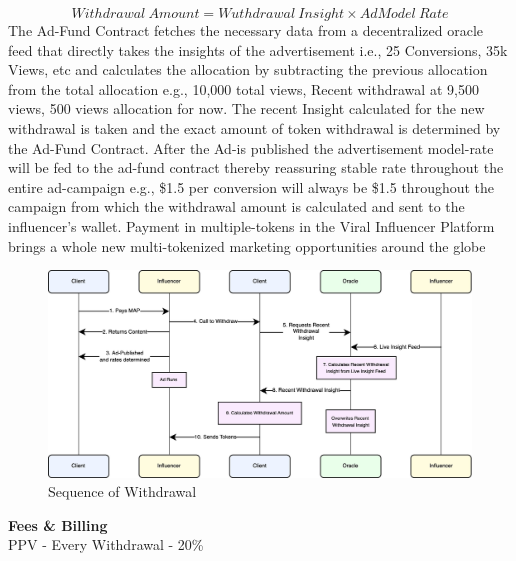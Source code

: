 \documentclass[10pt]{article}
\begin{document}
\begin{equation}
Withdrawal\:Amount=Wuthdrawal\:Insight \times AdModel\:Rate
\end{equation}
The Ad-Fund Contract fetches the necessary data from a decentralized oracle feed that directly takes the insights of the advertisement i.e., 25 Conversions, 35k Views, etc and calculates the allocation by subtracting the previous allocation from the total allocation e.g., 10,000 total views, Recent withdrawal at 9,500 views, 500 views allocation for now. The recent Insight calculated for the new withdrawal is taken and the exact amount of token withdrawal is determined by the Ad-Fund Contract. After the Ad-is published the advertisement model-rate will be fed to the ad-fund contract thereby reassuring stable rate throughout the entire ad-campaign e.g., \$1.5 per conversion will always be \$1.5 throughout the campaign from which the withdrawal amount is calculated and sent to the influencer's wallet. Payment in multiple-tokens in the Viral Influencer Platform brings a whole new multi-tokenized marketing opportunities around the globe\\

\begin{figure}[H]
\begin{center}
\includegraphics[width=\textwidth]{periodic-allocation-2}
\caption{Sequence of Withdrawal}
\end{center}
\end{figure}

\textbf{Fees \& Billing}\\

PPV - Every Withdrawal - 20\%\\
\end{document}
